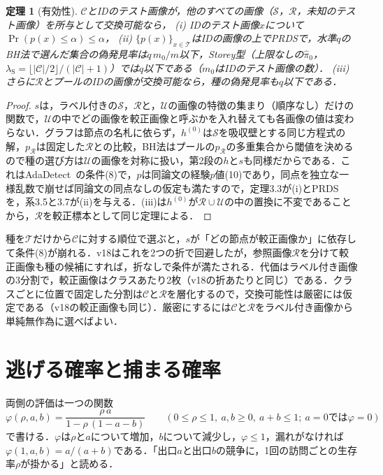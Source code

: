 \documentclass[a4paper,10pt,dvipdfmx]{jsarticle}
\newtheorem{theorem}{定理}
\theoremstyle{definition}
\newcommand{\cS}{\mathcal{S}}
\newcommand{\cR}{\mathcal{R}}
\newcommand{\cC}{\mathcal{C}}
\newcommand{\cT}{\mathcal{T}}
\newcommand{\cU}{\mathcal{U}}
\begin{document}
\begin{theorem}[有効性]
$\cC$とIDのテスト画像が，他のすべての画像（$\cS$，$\cR$，未知のテスト画像）を所与として交換可能なら，
(i) IDのテスト画像$x$について$\Pr(p(x)\le\alpha)\le\alpha$，
(ii) $\{p(x)\}_{x\in\cT}$はIDの画像の上でPRDSで，水準$q$のBH法で選んだ集合の偽発見率は$q\,m_0/m$以下，Storey型（上限なしの$\hat\pi_0$，$\lambda_{\mathrm{S}}=\lfloor|\cC|/2\rfloor/(|\cC|+1)$）では$q$以下である（$m_0$はIDのテスト画像の数）．
(iii) さらに$\cR$とプールのIDの画像が交換可能なら，種の偽発見率も$q$以下である．
\end{theorem}
\begin{proof}
$s$は，ラベル付きの$\cS$，$\cR$と，$\cU$の画像の特徴の集まり（順序なし）だけの関数で，$\cU$の中でどの画像を較正画像と呼ぶかを入れ替えても各画像の値は変わらない．グラフは節点の名札に依らず，$h^{(0)}$は$\cS$を吸収壁とする同じ方程式の解，$p_{\cR}$は固定した$\cR$との比較，BH法はプールの$p_{\cR}$の多重集合から閾値を決めるので種の選び方は$\cU$の画像を対称に扱い，第2段の$h$と$s$も同様だからである．これはAdaDetect~\cite{marandon2024adadetect}の条件(8)で，$p$は同論文の経験$p$値(10)であり，同点を独立な一様乱数で崩せば同論文の同点なしの仮定も満たすので，定理3.3が(i)とPRDSを，系3.5と3.7が(ii)を与える．(iii)は$h^{(0)}$が$\cR\cup\cU$の中の置換に不変であることから，$\cR$を較正標本として同じ定理による．
\end{proof}

種を$\cT$だけから$\cC$に対する順位で選ぶと，$s$が「どの節点が較正画像か」に依存して条件(8)が崩れる．v18はこれを2つの折で回避したが，参照画像$\cR$を分けて較正画像も種の候補にすれば，折なしで条件が満たされる．代価はラベル付き画像の3分割で，較正画像はクラスあたり2枚（v18の折あたりと同じ）である．クラスごとに位置で固定した分割は$\cC$と$\cR$を層化するので，交換可能性は厳密には仮定である（v18の較正画像も同じ）．厳密にするには$\cC$と$\cR$をラベル付き画像から単純無作為に選べばよい．

\section{逃げる確率と捕まる確率}
\label{sec:sep}
両側の評価は一つの関数
\begin{equation}
\varphi(\rho,a,b)=\frac{\rho\,a}{1-\rho\,(1-a-b)}\qquad(0\le\rho\le1,\ a,b\ge0,\ a+b\le1;\ a=0\text{では}\varphi=0)
\label{eq:phi}
\end{equation}
で書ける．$\varphi$は$\rho$と$a$について増加，$b$について減少し，$\varphi\le1$，漏れがなければ$\varphi(1,a,b)=a/(a+b)$である．「出口$a$と出口$b$の競争に，1回の訪問ごとの生存率$\rho$が掛かる」と読める．
\end{document}
